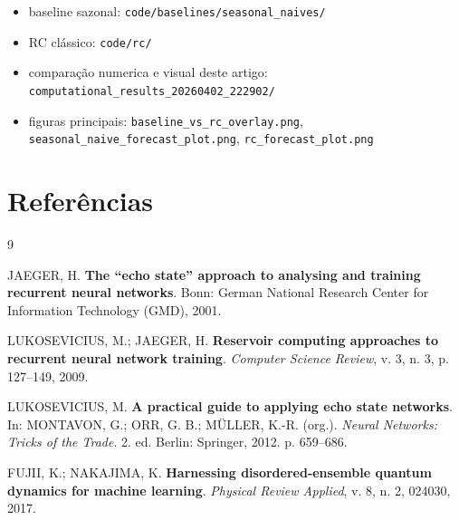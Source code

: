 \documentclass[12pt]{article}
\providecommand{\tightlist}{%
              \setlength{\itemsep}{0pt}\setlength{\parskip}{0pt}}
\begin{document}
\begin{itemize}
\tightlist
\item
  baseline sazonal: \texttt{code/baselines/seasonal\_naives/}
\item
  RC clássico: \texttt{code/rc/}
\item
  comparação numerica e visual deste artigo: \texttt{computational\_results\_20260402\_222902/}
\item
  figuras principais: \texttt{baseline\_vs\_rc\_overlay.png}, \texttt{seasonal\_naive\_forecast\_plot.png}, \texttt{rc\_forecast\_plot.png}
\end{itemize}

\section{Referências}\label{referencias}

\begin{thebibliography}{9}

JAEGER, H. \textbf{The ``echo state'' approach to analysing and training recurrent neural networks}. Bonn: German National Research Center for Information Technology (GMD), 2001.

LUKOSEVICIUS, M.; JAEGER, H. \textbf{Reservoir computing approaches to recurrent neural network training}. \emph{Computer Science Review}, v. 3, n. 3, p. 127--149, 2009.

LUKOSEVICIUS, M. \textbf{A practical guide to applying echo state networks}. In: MONTAVON, G.; ORR, G. B.; MÜLLER, K.-R. (org.). \emph{Neural Networks: Tricks of the Trade}. 2. ed. Berlin: Springer, 2012. p. 659--686.

FUJII, K.; NAKAJIMA, K. \textbf{Harnessing disordered-ensemble quantum dynamics for machine learning}. \emph{Physical Review Applied}, v. 8, n. 2, 024030, 2017.

\end{thebibliography}

            
\end{document}
